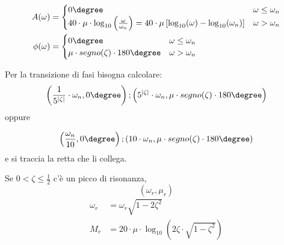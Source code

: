 \documentclass[a4paper]{article}
\begin{document}
\begin{definition}
  \[
    \begin{aligned}
      A(\omega) &= \begin{cases}
        0\degree & \omega \le \omega_n\\
        40 \cdot \mu \cdot \log_{10} \left( \frac{\omega}{\omega_n} \right) = 40 \cdot \mu \left[
      \log_{10}(\omega) - \log_{10}(\omega_n) \right] & \omega > \omega_n
    \end{cases}\\
        \phi(\omega) &= \begin{cases}
          0\degree & \omega \le \omega_n\\
          \mu \cdot segno(\zeta) \cdot 180\degree & \omega > \omega_n
        \end{cases}
        \end{aligned}
      \] 

      Per la transizione di fasi bisogna calcolare:
      \[
        \left( \frac{1}{5^{|\zeta|}} \cdot \omega_n, 0\degree \right);
        \left( 5^{|\zeta|} \cdot \omega_n, \mu \cdot segno(\zeta) \cdot 180\degree \right) 
      \] 
      oppure

      \[
        \left( \frac{\omega_n}{10}, 0\degree \right);
        \left(10 \cdot \omega_n, \mu \cdot segno(\zeta) \cdot 180\degree \right) 
      \] 
      e si traccia la retta che li collega.

      \vspace{1em}
      \noindent
      Se \( 0 < \zeta \le \frac{1}{2} \) c'è un picco di risonanza,
      \[
        \left( \omega_r, \mu_r \right) 
      \] 
      \[
        \begin{aligned}
          \omega_r &= \omega_r \sqrt{1 - 2 \zeta^2}\\ 
          M_r &= 20 \cdot \mu \cdot \log_{10} \left( 2 \zeta \cdot \sqrt{1 - \zeta^2} \right)
        \end{aligned}
      \] 
\end{definition}
\end{document}
